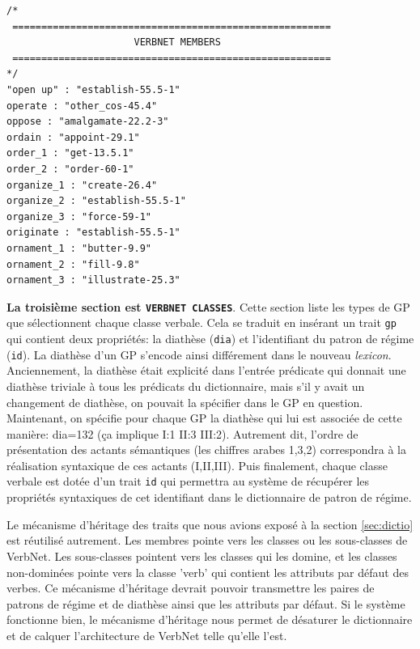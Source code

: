 \begin{lstlisting}[language=XML, caption = Partie membre du lexicon]
/*
 =======================================================
                      VERBNET MEMBERS
 =======================================================
*/
"open up" : "establish-55.5-1"
operate : "other_cos-45.4"
oppose : "amalgamate-22.2-3"
ordain : "appoint-29.1"
order_1 : "get-13.5.1"
order_2 : "order-60-1"
organize_1 : "create-26.4"
organize_2 : "establish-55.5-1"
organize_3 : "force-59-1"
originate : "establish-55.5-1"
ornament_1 : "butter-9.9"
ornament_2 : "fill-9.8"
ornament_3 : "illustrate-25.3"
\end{lstlisting}

\textbf{La troisième section est \texttt{VERBNET CLASSES}}. Cette section liste les types de \ac{GP} que sélectionnent chaque classe verbale. Cela se traduit en insérant un trait \texttt{gp} qui contient deux propriétés: la diathèse (\texttt{dia}) et l'identifiant du patron de régime (\texttt{id}). La diathèse d'un \ac{GP} s'encode ainsi différement dans le nouveau \emph{lexicon}. Anciennement, la diathèse était explicité dans l'entrée prédicate qui donnait une diathèse triviale à tous les prédicats du dictionnaire, mais s'il y avait un changement de diathèse, on pouvait la spécifier dans le \ac{GP} en question. Maintenant, on spécifie pour chaque \ac{GP} la diathèse qui lui est associée de cette manière: dia=132 (ça implique I:1 II:3 III:2). Autrement dit, l'ordre de présentation des actants sémantiques (les chiffres arabes 1,3,2) correspondra à la réalisation syntaxique de ces actants (I,II,III). Puis finalement, chaque classe verbale est dotée d'un trait \texttt{id} qui permettra au système de récupérer les propriétés syntaxiques de cet identifiant dans le dictionnaire de patron de régime.

Le mécanisme d'héritage des traits que nous avions exposé à la section \ref{sec:dictio} est réutilisé autrement. Les membres pointe vers les classes ou les sous-classes de VerbNet. Les sous-classes pointent vers les classes qui les domine, et les classes non-dominées pointe vers la classe 'verb' qui contient les attributs par défaut des verbes. Ce mécanisme d'héritage devrait pouvoir transmettre les paires de patrons de régime et de diathèse ainsi que les attributs par défaut. Si le système fonctionne bien, le mécanisme d'héritage nous permet de désaturer le dictionnaire et de calquer l'architecture de VerbNet telle qu'elle l'est.

